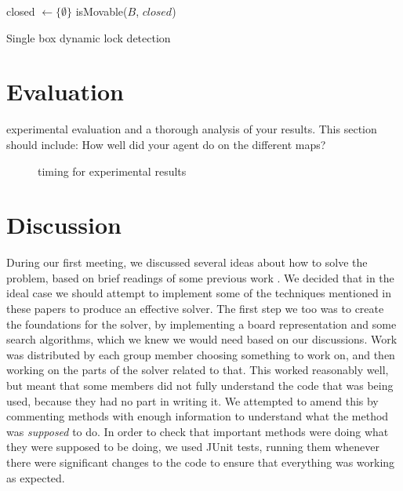 \documentclass[a4paper,11pt]{article}
\begin{document}
\begin{algorithm}
  \DontPrintSemicolon
  closed $\longleftarrow \{\emptyset\}$\;
  \Return isMovable($B$, $closed$)

\caption{Single box dynamic lock detection}
\label{alg:singledynamiclock}
\end{algorithm}

\section{Evaluation}
experimental evaluation and a thorough analysis of your results. This section should include:
How well did your agent do on the different maps?
\begin{figure}
  \centering

  \caption{timing for experimental results}
  \label{fig:exptime}
\end{figure}
\section{Discussion}
During our first meeting, we discussed several ideas about how to solve the
problem, based on brief readings of some previous work \cite{virkkala, jung}. We
decided that in the ideal case we should attempt to implement some of the
techniques mentioned in these papers to produce an effective solver. The first
step we too was to create the foundations for the solver, by implementing a
board representation and some search algorithms, which we knew we would need
based on our discussions. Work was distributed by each group member choosing
something to work on, and then working on the parts of the solver related to
that. This worked reasonably well, but meant that some members did not fully
understand the code that was being used, because they had no part in writing
it. We attempted to amend this by commenting methods with enough information to
understand what the method was \emph{supposed} to do. In order to check that
important methods were doing what they were supposed to be doing, we used JUnit
tests, running them whenever there were significant changes to the code to
ensure that everything was working as expected.
\end{document}

